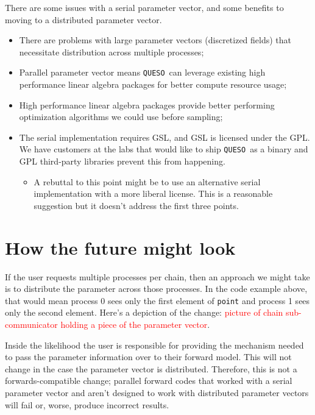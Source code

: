 \documentclass{article}
\newcommand{\Queso}{\texttt{QUESO}}
\begin{document}
There are some issues with a serial parameter vector, and some benefits to
moving to a distributed parameter vector.
\begin{itemize}
  \item There are problems with large parameter vectors (discretized fields)
    that necessitate distribution across multiple processes;
  \item Parallel parameter vector means \Queso\ can leverage existing high
    performance linear algebra packages for better compute resource usage;
  \item High performance linear algebra packages provide better performing
    optimization algorithms we could use before sampling;
  \item The serial implementation requires GSL, and GSL is licensed under the
    GPL.  We have customers at the labs that would like to ship \Queso\ as a
    binary and GPL third-party libraries prevent this from happening.
    \begin{itemize}
      \item A rebuttal to this point might be to use an alternative serial
        implementation with a more liberal license.  This is a reasonable
        suggestion but it doesn't address the first three points.
    \end{itemize}
\end{itemize}

\section{How the future might look}

If the user requests multiple processes per chain, then an approach we might
take is to distribute the parameter across those processes.  In the code
example above, that would mean process 0 sees only the first element of
\lstinline|point| and process 1 sees only the second element.  Here's a
depiction of the change: \textcolor{red}{picture of chain sub-communicator
holding a piece of the parameter vector}.

Inside the likelihood the user is responsible for providing the mechanism
needed to pass the parameter information over to their forward model.  This
will not change in the case the parameter vector is distributed.  Therefore,
this is not a forwards-compatible change; parallel forward codes that worked
with a serial parameter vector and aren't designed to work with distributed
parameter vectors will fail or, worse, produce incorrect results.
\end{document}
